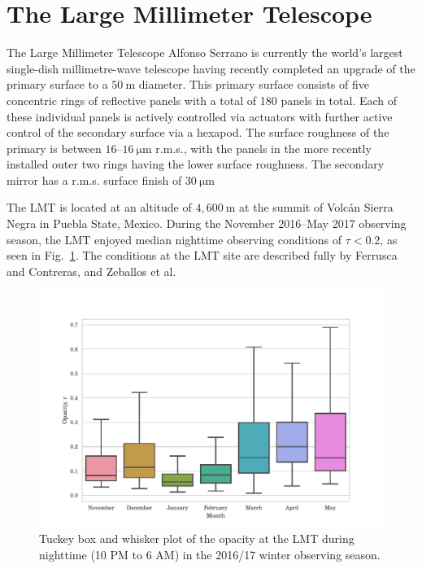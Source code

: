 \documentclass{spie}
\begin{document}
\section{The Large Millimeter Telescope}
The Large Millimeter Telescope Alfonso Serrano is currently the world's largest single-dish millimetre-wave telescope having recently completed an upgrade of the primary surface to a $50~\si{\metre}$ diameter. This primary surface consists of five concentric rings of reflective panels with a total of 180 panels in total. Each of these individual panels is actively controlled via actuators with further active control of the secondary surface via a hexapod. The surface roughness of the primary is between $16\mbox{--}16~\si{\micro\metre}$ r.m.s., with the panels in the more recently installed outer two rings having the lower surface roughness. The secondary mirror has a r.m.s. surface finish of $30~\si{\micro\metre}$
\par 
The LMT is located at an altitude of $4,600~\si{\metre}$ at the summit of Volc\'{a}n Sierra Negra in Puebla State, Mexico. During the November 2016--May 2017 observing season, the LMT enjoyed median nighttime observing conditions of $\tau < 0.2$, as seen in Fig.~\ref{fig:tau}. The conditions at the LMT site are described fully by Ferrusca and Contreras,\cite{Ferrusca2014} and Zeballos et al.\cite{Zeballos2016}
\begin{figure}[tb]
\centering
\includegraphics[height=0.45\textheight]{tau_Nov16-May17}
\caption{Tuckey box and whisker plot of the opacity at the LMT during nighttime (10 PM to 6 AM) in the 2016/17 winter observing season.}\label{fig:tau}
\end{figure}
%
\end{document}
